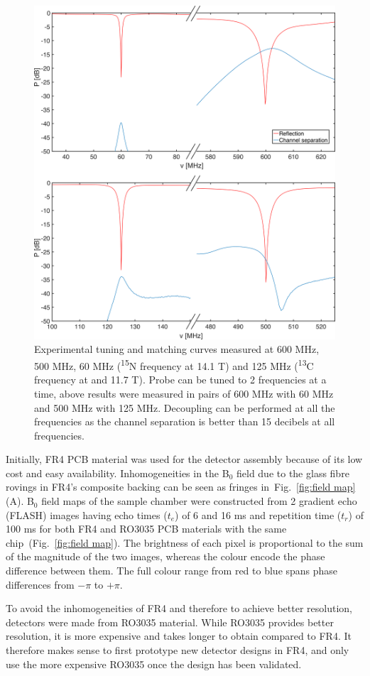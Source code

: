 \documentclass[preprint,5p]{elsarticle}
\newcommand{\fig}[1]{Fig.~\ref{#1}}
\begin{document}
\begin{figure}
\centering
\includegraphics[width=.7\linewidth,keepaspectratio=true]{./figures/ms5n17-tlp-im-180710-tandm-sameaxis.png} 
\caption{
Experimental tuning and matching curves measured at 600 MHz, 500 MHz, 
60 MHz (\textsuperscript{15}N frequency at 14.1 T) and 125 MHz (\textsuperscript{13}C frequency at  and 11.7 T). 
Probe can be tuned to 2 frequencies at a time, above results were measured in 
pairs of 600 MHz with 60 MHz and 500 MHz with 125 MHz. Decoupling can be performed at all the 
frequencies as the channel separation is better than 15 decibels at all frequencies.}
\label{fig:tandm} 
\end{figure}
Initially, FR4 PCB material was used for the detector assembly because of its low cost and easy availability. 
Inhomogeneities in the B$_0$ field due to the glass fibre rovings in FR4's composite backing can be seen as fringes in~\fig{fig:field map} (A). B$_{0}$ field maps of the sample chamber were constructed from 2 gradient echo (FLASH) images having echo times ($t_{e}$) of 6 and 16 ms and repetition time ($t_{r}$) of 100 ms for both FR4 and RO3035 PCB materials with the same chip~(\fig{fig:field map}). The brightness of each pixel is proportional to the sum of the magnitude of the two images, whereas the colour encode the phase difference between them. The full colour range from red to blue spans phase differences from $-\pi$ to $+\pi$.

To avoid the inhomogeneities of FR4 and therefore to achieve better resolution, 
detectors were made from RO3035 material. While RO3035 provides better resolution, it is more expensive 
and takes longer to obtain compared to FR4. 
It therefore makes sense to first prototype new detector designs in FR4, and only use the more expensive RO3035 
once the design has been validated.
\end{document}
